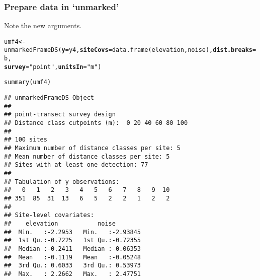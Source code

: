 \documentclass[color=usenames,dvipsnames]{beamer}\usepackage[]{graphicx}\usepackage[]{xcolor}
\makeatletter
\newcommand{\hlsng}[1]{\textcolor[rgb]{0.749,0.012,0.012}{#1}}%
\newcommand{\hldef}[1]{\textcolor[rgb]{0,0,0}{#1}}%
\newcommand{\hlkwb}[1]{\textcolor[rgb]{0,0.341,0.682}{#1}}%
\newcommand{\hlkwc}[1]{\textcolor[rgb]{0,0,0}{\textbf{#1}}}%
\newcommand{\hlkwd}[1]{\textcolor[rgb]{0.004,0.004,0.506}{#1}}%
\newenvironment{kframe}{%
 \def\at@end@of@kframe{}%
 \ifinner\ifhmode%
  \def\at@end@of@kframe{\end{minipage}}%
  \begin{minipage}{\columnwidth}%
 \fi\fi%
 \def\FrameCommand##1{\hskip\@totalleftmargin \hskip-\fboxsep
 \colorbox{shadecolor}{##1}\hskip-\fboxsep
     \hskip-\linewidth \hskip-\@totalleftmargin \hskip\columnwidth}%
 \MakeFramed {\advance\hsize-\width
   \@totalleftmargin\z@ \linewidth\hsize
   \@setminipage}}%
 {\par\unskip\endMakeFramed%
 \at@end@of@kframe}
\newenvironment{knitrout}{}{} %
\makeatother
\begin{document}
\begin{frame}[fragile]
  \frametitle{Prepare data in `unmarked'}
  \small
  Note the new arguments.
  \vspace{-6pt}
\begin{knitrout}\tiny
{}\color{fgcolor}\begin{kframe}
\begin{alltt}
\hldef{umf4} \hlkwb{<-} \hlkwd{unmarkedFrameDS}\hldef{(}\hlkwc{y}\hldef{=y4,} \hlkwc{siteCovs}\hldef{=}\hlkwd{data.frame}\hldef{(elevation,noise),} \hlkwc{dist.breaks}\hldef{=b,}
                       \hlkwc{survey}\hldef{=}\hlsng{"point"}\hldef{,} \hlkwc{unitsIn}\hldef{=}\hlsng{"m"}\hldef{)}
\end{alltt}
\end{kframe}
\end{knitrout}
\pause
\begin{knitrout}\tiny
{}\color{fgcolor}\begin{kframe}
\begin{alltt}
\hlkwd{summary}\hldef{(umf4)}
\end{alltt}
\begin{verbatim}
## unmarkedFrameDS Object
## 
## point-transect survey design
## Distance class cutpoints (m):  0 20 40 60 80 100 
## 
## 100 sites
## Maximum number of distance classes per site: 5 
## Mean number of distance classes per site: 5 
## Sites with at least one detection: 77 
## 
## Tabulation of y observations:
##   0   1   2   3   4   5   6   7   8   9  10 
## 351  85  31  13   6   5   2   2   1   2   2 
## 
## Site-level covariates:
##    elevation           noise         
##  Min.   :-2.2953   Min.   :-2.93845  
##  1st Qu.:-0.7225   1st Qu.:-0.72355  
##  Median :-0.2411   Median :-0.06353  
##  Mean   :-0.1119   Mean   :-0.05248  
##  3rd Qu.: 0.6033   3rd Qu.: 0.53973  
##  Max.   : 2.2662   Max.   : 2.47751
\end{verbatim}
\end{kframe}
\end{knitrout}
\end{frame}
\end{document}
